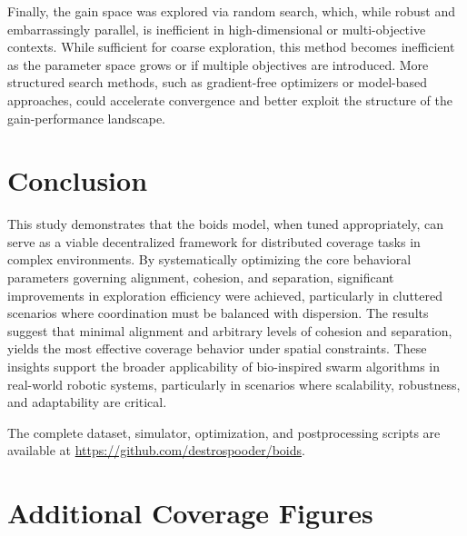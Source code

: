 \documentclass[12pt]{article}
\begin{document}
Finally, the gain space was explored via random search, which, while robust and embarrassingly parallel, is inefficient in high-dimensional or multi-objective contexts. While sufficient for coarse exploration, this method becomes inefficient as the parameter space grows or if multiple objectives are introduced. More structured search methods, such as gradient-free optimizers or model-based approaches, could accelerate convergence and better exploit the structure of the gain-performance landscape.

\section{Conclusion}

This study demonstrates that the boids model, when tuned appropriately, can serve as a viable decentralized framework for distributed coverage tasks in complex environments. By systematically optimizing the core behavioral parameters governing alignment, cohesion, and separation, significant improvements in exploration efficiency were achieved, particularly in cluttered scenarios where coordination must be balanced with dispersion. The results suggest that minimal alignment and arbitrary levels of cohesion and separation, yields the most effective coverage behavior under spatial constraints. These insights support the broader applicability of bio-inspired swarm algorithms in real-world robotic systems, particularly in scenarios where scalability, robustness, and adaptability are critical.

The complete dataset, simulator, optimization, and postprocessing scripts are available at \url{https://github.com/destrospooder/boids}.



\newpage

\appendix
\section{Additional Coverage Figures}
\end{document}

